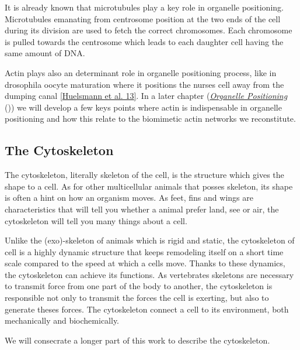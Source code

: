 \documentclass[A4paperpaper,11pt,english]{sphinxmanual}
\begin{document}
It is already known that microtubules play a key role in organelle positioning.
Microtubules emanating from centrosome position at the two ends of the cell
during its division are used to fetch the correct chromosomes. Each
chromosome is pulled towards the centrosome which leads to each daughter
cell having the same amount of DNA.

Actin plays also an determinant role in organelle positioning process,
like in drosophila oocyte maturation where it positions the nurses cell away
from the dumping canal {\hyperref[index-latex:huelsmann2013]{{[}Huelsmann et al. 13{]}}}. In a later chapter ({\hyperref[index-latex:organelle-positioning]{\emph{Organelle
Positioning}}} ()) we will develop a few keys points where
actin is indispensable in organelle positioning and how this relate to the
biomimetic actin networks we reconstitute.


\subsection{The Cytoskeleton}
\label{index-latex:intro-cyto}\label{index-latex:the-cytoskeleton}
The cytoskeleton, literally skeleton of the cell, is the structure which gives
the shape to a cell.  As for other multicellular animals that posses
skeleton, its shape is often a hint on how an organism moves. As feet, fins and
wings are characteristics that will tell you whether a animal
prefer land, see or air, the cytoskeleton will tell you many
things about a cell.

Unlike the (exo)-skeleton of animals which is rigid and
static, the cytoskeleton of cell is a  highly dynamic structure that keeps
remodeling itself on a short time scale compared to the speed at which a cells
move. Thanks to these dynamics, the cytoskeleton can achieve its
functions.  As vertebrates skeletons are necessary to transmit force from one part
of the body to another, the cytoskeleton is responsible not only to
transmit the forces the cell is exerting, but also to generate theses forces.
The cytoskeleton connect a cell to its environment,
both mechanically and biochemically.

We will consecrate a longer part of this work to describe the cytoskeleton.
\end{document}
